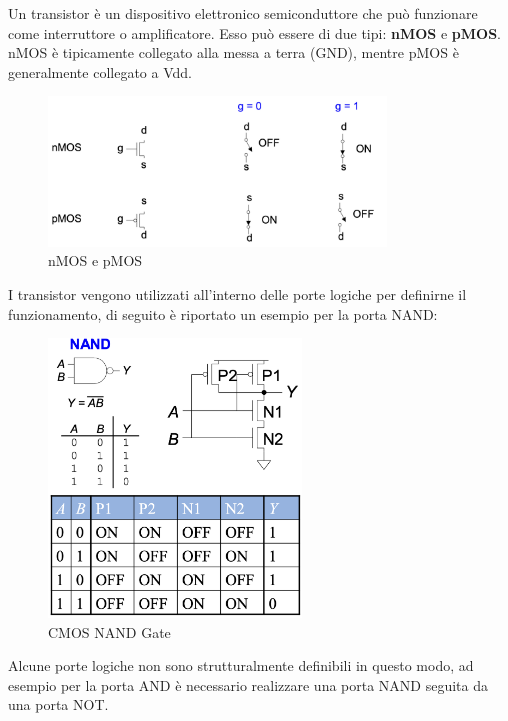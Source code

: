 \documentclass[../main.tex]{subfiles}
\begin{document}
Un transistor è un dispositivo elettronico semiconduttore che può funzionare come interruttore o amplificatore. 
Esso può essere di due tipi: \textbf{nMOS} e \textbf{pMOS}. nMOS è tipicamente collegato alla messa a terra (GND), mentre 
pMOS è generalmente collegato a Vdd.
\begin{figure}[h]
    \centering
    \includegraphics[width=0.8\textwidth]{images/transistor.png}
    \caption{nMOS e pMOS}
\end{figure}

I transistor vengono utilizzati all'interno delle porte logiche per definirne il funzionamento,
di seguito è riportato un esempio per la porta NAND:
\begin{figure}[h]
    \centering
    \includegraphics[width=0.6\textwidth]{images/cMOSNAND.png}
    \caption{CMOS NAND Gate}
\end{figure}

Alcune porte logiche non sono strutturalmente definibili in questo modo, ad esempio per la porta AND è necessario
realizzare una porta NAND seguita da una porta NOT.
\end{document}
